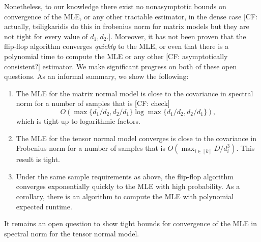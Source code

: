 \documentclass{article}
\newcommand{\CF}[1]{{\color{purple}[CF: #1]}}
\begin{document}
Nonetheless, to our knowledge there exist no nonasymptotic bounds on convergence of the MLE, or any other tractable estimator, in the dense case \CF{actually, tsiligkaridis do this in frobenius norm for matrix models but they are not tight for every value of $d_1, d_2$.}. Moreover, it has not been proven that the flip-flop algorithm converges \emph{quickly} to the MLE, or even that there is a polynomial time to compute the MLE or any other \CF{asymptotically consistent?} estimator. We make significant progress on both of these open questions. As an informal summary, we show the following:
\begin{enumerate}
\item The MLE for the matrix normal model is close to the covariance in spectral norm for a number of samples that is \CF{check}
$$O(\max \{d_1/d_2, d_2/d_1\} \log \max \{d_1/d_2, d_2/d_1\}),$$ which is tight up to logarithmic factors.
\item The MLE for the tensor normal model converges is close to the covariance in Frobenius norm for a number of samples that is $O(\max_{i \in [k]} D/d_i^3)$. This result is tight.
\item Under the same sample requirements as above, the flip-flop algorithm converges exponentially quickly to the MLE with high probability. As a corollary, there is an algorithm to compute the  MLE with polynomial expected runtime.
\end{enumerate}
It remains an open question to show tight bounds for convergence of the MLE in spectral norm for the tensor normal model.
\end{document}

